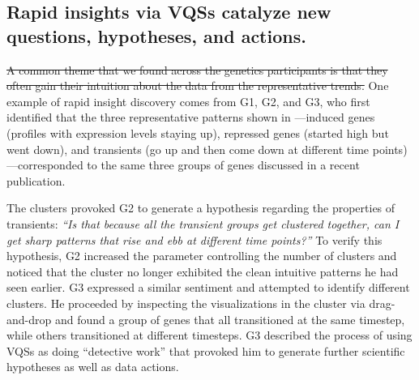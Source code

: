 \subsection{Rapid insights via VQSs catalyze new questions, hypotheses, and actions.}
\par {}
\par \sout{A common theme that we found across the genetics participants is that they often gain their intuition about the data from the representative trends.} One example of rapid insight discovery comes from G1, G2, and G3, who first identified that the three representative patterns shown in \zv---induced genes (profiles with expression levels staying up), repressed genes (started high but went down), and transients (go up and then come down at different time points)---corresponded to the same three groups of genes discussed in a recent publication\cite{Gloss2017}. 
\par The clusters provoked G2 to generate a hypothesis regarding the properties of transients: \textit{``Is that because all the transient groups get clustered together, can I get sharp patterns that rise and ebb at different time points?''} To verify this hypothesis, G2 increased the parameter controlling the number of clusters and noticed that the cluster no longer exhibited the clean intuitive patterns he had seen earlier. G3 expressed a similar sentiment and attempted to identify different clusters. He proceeded by inspecting the visualizations in the cluster via drag-and-drop and found a group of genes that all transitioned at the same timestep, while others transitioned at different timesteps. G3 described the process of using VQSs as doing ``detective work'' that provoked him to generate further scientific hypotheses as well as data actions.